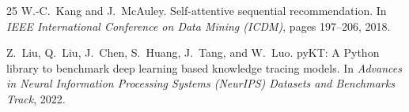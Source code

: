 \documentclass[sigconf,anonymous]{acmart}
\begin{document}
\begin{thebibliography}{25}
W.-C.~Kang and J.~McAuley.
\newblock Self-attentive sequential recommendation.
\newblock In \emph{IEEE International Conference on Data Mining (ICDM)}, pages 197--206, 2018.

Z.~Liu, Q.~Liu, J.~Chen, S.~Huang, J.~Tang, and W.~Luo.
\newblock pyKT: A Python library to benchmark deep learning based knowledge tracing models.
\newblock In \emph{Advances in Neural Information Processing Systems (NeurIPS) Datasets and Benchmarks Track}, 2022.

\end{thebibliography}
\end{document}

